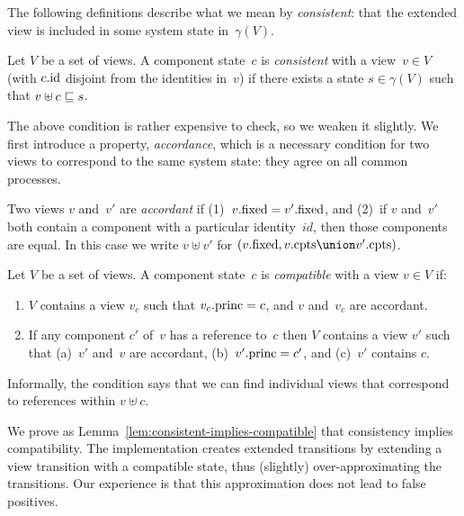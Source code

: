 The following definitions describe what we mean by \emph{consistent}: that the
extended view is included in some system state in~$\gamma(V)$.
%
\begin{definition}
Let $V$ be a set of views.  A component state~$c$ is \emph{consistent} with a
view~$v \in V$ (with $c.\mathrm{id}$ disjoint from the identities in~$v$) if there
exists a state $s \in \gamma(V)$ such that $v \uplus c \sqsubseteq s$.
\end{definition}
%
The above condition is rather expensive to check, so we weaken it slightly.
We first introduce a property, \emph{accordance}, which is a necessary
condition for two views to correspond to the same system state: they agree on
all common processes.
%
\begin{definition}
Two views $v$ and~$v'$ are \emph{accordant} if (1)~$v.\mathrm{fixed} = v'.\mathrm{fixed}$, and
(2)~if $v$ and~$v'$ both contain a component with a particular identity~$id$,
then those components are equal.  In this case we write $v \uplus v'$ for
$(v.\fixed, v.\cpts \union v'.\cpts)$.  
\end{definition}


\begin{definition}
\label{def:compatible}
Let $V$ be a set of views.  A component state~$c$ is \emph{compatible} with a
view $v \in V$ if:
%
\begin{enumerate}
\item\label{item:compatible-1} $V$ contains a view $v_c$ such that
$v_c.\mathrm{princ} = c$,
and $v$ and~$v_c$ are accordant.


\item\label{item:compatible-2} If any component $c'$ of~$v$ has a reference
  to~$c$ then $V$ contains a view $v'$ such that (a)~$v'$ and~$v$ are
  accordant,
  (b)~$v'.\mathrm{princ} = c'$, and (c)~$v'$ contains $c$.
\end{enumerate}
\end{definition}
%
Informally, the condition says that we can find individual views that
correspond to references within $v \uplus c$. 

We prove as Lemma~\ref{lem:consistent-implies-compatible} that consistency
implies compatibility.  The implementation creates extended transitions by
extending a view transition with a compatible state, thus (slightly)
over-approximating the transitions.  Our experience is that this approximation
does not lead to false positives.

